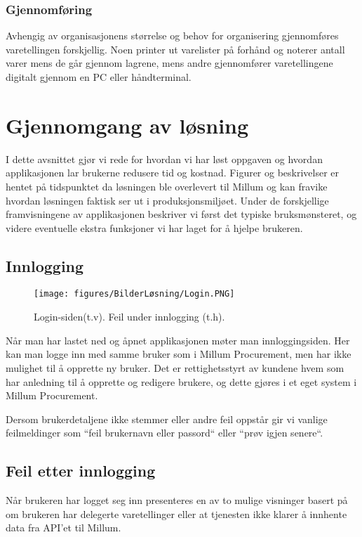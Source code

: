 \subsubsection{\textbf{Gjennomføring}}
Avhengig av organisasjonens størrelse og behov for organisering gjennomføres varetellingen forskjellig. Noen printer ut varelister på forhånd og noterer antall varer mens de går gjennom lagrene, mens andre gjennomfører varetellingene digitalt gjennom en PC eller håndterminal. 

\section{\textbf{Gjennomgang av løsning}}
I dette avsnittet gjør vi rede for hvordan vi har løst oppgaven og hvordan applikasjonen lar brukerne redusere tid og kostnad. Figurer og beskrivelser er hentet på tidspunktet da løsningen ble overlevert til Millum og kan fravike hvordan løsningen faktisk ser ut i produksjonsmiljøet. Under de forskjellige framvisningene av applikasjonen beskriver vi først det typiske bruksmønsteret, og videre eventuelle ekstra funksjoner vi har laget for å hjelpe brukeren.

\subsection{\textbf{Innlogging}}

\begin{figure}[H] 
    \centering
    \texttt{[image: figures/BilderLøsning/Login.PNG]}
    \caption{Login-siden(t.v). Feil under innlogging (t.h).}
\end{figure}


Når man har lastet ned og åpnet applikasjonen møter man innloggingsiden. Her kan man logge inn med samme bruker som i Millum Procurement, men har ikke mulighet til å opprette ny bruker. Det er rettighetsstyrt av kundene hvem som har anledning til å opprette og redigere brukere, og dette gjøres i et eget system i Millum Procurement. 


Dersom brukerdetaljene ikke stemmer eller andre feil oppstår gir vi vanlige feilmeldinger som ``feil brukernavn eller passord`` eller ``prøv igjen senere``.

\subsection{\textbf{Feil etter innlogging}}
Når brukeren har logget seg inn presenteres en av to mulige visninger basert på om brukeren har delegerte varetellinger eller at tjenesten ikke klarer å innhente data fra API'et til Millum.

